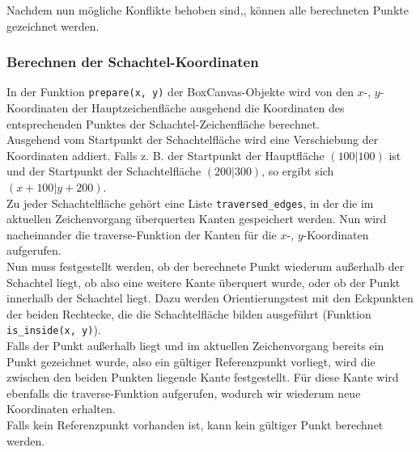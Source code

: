 Nachdem nun mögliche Konflikte behoben sind,, können alle berechneten Punkte gezeichnet werden.\\


\subsubsection{Berechnen der Schachtel-Koordinaten}
\label{subsubsec:schachtelkoordinaten}

In der Funktion \texttt{prepare(x, y)} der BoxCanvas-Objekte wird von den $x$-, $y$-Koordinaten der Hauptzeichenfläche ausgehend die Koordinaten des entsprechenden Punktes der Schachtel-Zeichenfläche berechnet.\\

Ausgehend vom Startpunkt der Schachtelfläche wird eine Verschiebung der Koordinaten addiert. Falls z. B. der Startpunkt der Hauptfläche $(100|100)$ ist und der Startpunkt der Schachtelfläche $(200|300)$, so ergibt sich $(x+100|y+200)$.\\

Zu jeder Schachtelfläche gehört eine Liste \texttt{traversed\_edges}, in der die im aktuellen Zeichenvorgang überquerten Kanten gespeichert werden. Nun wird nacheinander die traverse-Funktion der Kanten für die $x$-, $y$-Koordinaten aufgerufen.\\

Nun muss festgestellt werden, ob der berechnete Punkt wiederum außerhalb der Schachtel liegt, ob also eine weitere Kante überquert wurde, oder ob der Punkt innerhalb der Schachtel liegt. Dazu werden Orientierungstest mit den Eckpunkten der beiden Rechtecke, die die Schachtelfläche bilden ausgeführt (Funktion \texttt{is\_inside(x, y)}).\\

Falls der Punkt außerhalb liegt und im aktuellen Zeichenvorgang bereits ein Punkt gezeichnet wurde, also ein gültiger Referenzpunkt vorliegt, wird die zwischen den beiden Punkten liegende Kante festgestellt. Für diese Kante wird ebenfalls die traverse-Funktion aufgerufen, wodurch wir wiederum neue Koordinaten erhalten.\\

Falls kein Referenzpunkt vorhanden ist, kann kein gültiger Punkt berechnet werden.\\

